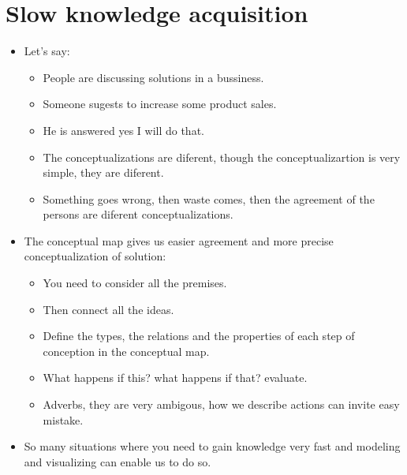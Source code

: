 \section{Slow knowledge acquisition}
\begin{itemize}
    \item Let's say:
        \begin{itemize}
            \item People are discussing solutions in a bussiness.
            \item Someone sugests to increase some product sales.
            \item He is answered yes I will do that.
            \item The conceptualizations are diferent, though the conceptualizartion is very simple, they are diferent.
            \item Something goes wrong, then waste comes, then the agreement of the persons are diferent conceptualizations.
        \end{itemize}
    \item The conceptual map gives us easier agreement and more precise conceptualization of solution:
        \begin{itemize}
            \item You need to consider all the premises.
            \item Then connect all the ideas.
            \item Define the types, the relations and the properties of each step of conception in the conceptual map.
            \item What happens if this? what happens if that? evaluate.
            \item Adverbs, they are very ambigous, how we describe actions can invite easy mistake.
        \end{itemize}
    
    \item So many situations where you need to gain knowledge very fast and modeling and visualizing can enable us to do so.
\end{itemize}


